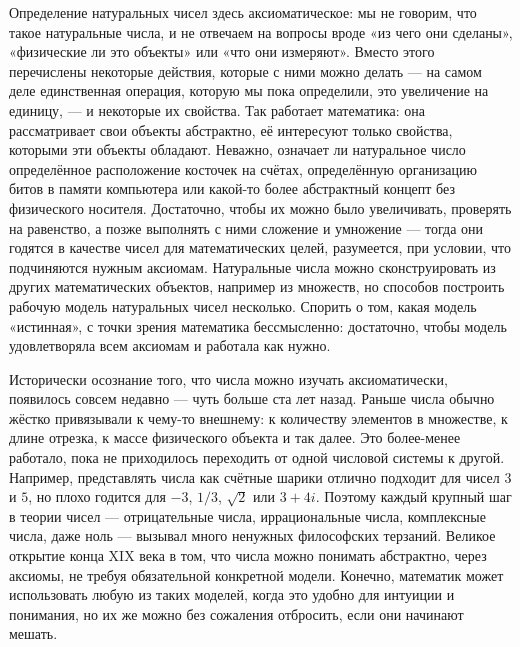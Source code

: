 \begin{remark}
Определение натуральных чисел здесь аксиоматическое: мы не говорим, что такое натуральные
числа, и не отвечаем на вопросы вроде «из чего они сделаны», «физические ли это объекты» или
«что они измеряют». Вместо этого перечислены некоторые действия, которые с ними можно
делать — на самом деле единственная операция, которую мы пока определили, это увеличение на
единицу, — и некоторые их свойства. Так работает математика: она рассматривает свои объекты
абстрактно, её интересуют только свойства, которыми эти объекты обладают. Неважно, означает
ли натуральное число определённое расположение косточек на счётах, определённую организацию
битов в памяти компьютера или какой-то более абстрактный концепт без физического носителя.
Достаточно, чтобы их можно было увеличивать, проверять на равенство, а позже выполнять с ними
сложение и умножение — тогда они годятся в качестве чисел для математических целей,
разумеется, при условии, что подчиняются нужным аксиомам. Натуральные числа можно
сконструировать из других математических объектов, например из множеств, но способов
построить рабочую модель натуральных чисел несколько. Спорить о том, какая модель «истинная»,
с точки зрения математика бессмысленно: достаточно, чтобы модель удовлетворяла всем аксиомам
и работала как нужно.
\end{remark}

\begin{remark}
Исторически осознание того, что числа можно изучать аксиоматически, появилось совсем
недавно — чуть больше ста лет назад. Раньше числа обычно жёстко привязывали к чему-то
внешнему: к количеству элементов в множестве, к длине отрезка, к массе физического объекта и
так далее. Это более-менее работало, пока не приходилось переходить от одной числовой системы
к другой. Например, представлять числа как счётные шарики отлично подходит для чисел $3$ и
$5$, но плохо годится для $-3$, $1/3$, $\sqrt2$ или $3{+}4i$. Поэтому каждый крупный шаг в
теории чисел — отрицательные числа, иррациональные числа, комплексные числа, даже ноль —
вызывал много ненужных философских терзаний. Великое открытие конца XIX века в том, что числа
можно понимать абстрактно, через аксиомы, не требуя обязательной конкретной модели. Конечно,
математик может использовать любую из таких моделей, когда это удобно для интуиции и
понимания, но их же можно без сожаления отбросить, если они начинают мешать.
\end{remark}
